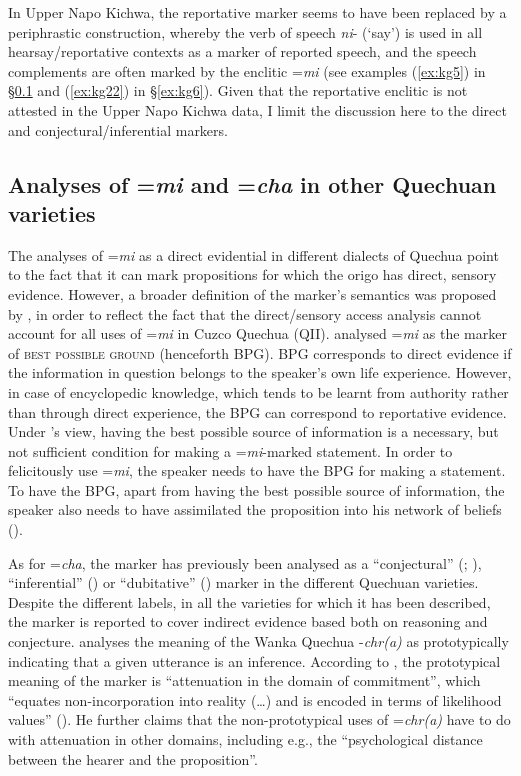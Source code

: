 \documentclass[output=paper]{langscibook}
\begin{document}
In Upper Napo Kichwa, the reportative marker  seems to have been replaced by a periphrastic construction, whereby the verb of speech \textit{ni}- (‘say’) is used in all hearsay/reportative contexts as a marker of reported speech, and the speech complements are often marked by the enclitic =\textit{mi} (see examples (\ref{ex:kg5}) in §‎\ref{s:kg3-2} and (\ref{ex:kg22}) in §‎\ref{ex:kg6}). Given that the reportative enclitic is not attested in the Upper Napo Kichwa data, I limit the discussion here to the direct and conjectural/inferential markers.


\subsection{Analyses of =\textit{mi} and =\textit{cha} in other Quechuan varieties}\label{s:kg3-2}

The analyses of =\textit{mi} as a direct evidential in different dialects of Quechua point to the fact that it can mark propositions for which the origo has direct, sensory evidence. However, a broader definition of the marker’s semantics was proposed by \cite{Faller2002}, in order to reflect the fact that the direct/sensory access analysis cannot account for all uses of =\textit{mi} in Cuzco Quechua (QII). \cite{Faller2002} analysed =\textit{mi} as the marker of \textsc{best possible ground} (henceforth BPG). BPG corresponds to direct evidence if the information in question belongs to the speaker’s own life experience. However, in case of encyclopedic knowledge, which tends to be learnt from authority rather than through direct experience, the BPG can correspond to reportative evidence. Under \citeauthor{Faller2002}’s view, having the best possible source of information is a necessary, but not sufficient condition for making a =\textit{mi}-marked statement. In order to felicitously use =\textit{mi}, the speaker needs to have the BPG for making a statement. To have the BPG, apart from having the best possible source of information, the speaker also needs to have assimilated the proposition into his network of beliefs (\citealt[140--141]{Faller2002}).

As for =\textit{cha}, the marker has previously been analysed as a “conjectural” (\citealt{Weber1986}; \citealt{Faller2002}), “inferential” (\citealt{Floyd1997}) or “dubitative” (\citealt{Muysken1995}) marker in the different Quechuan varieties. Despite the different labels, in all the varieties for which it has been described, the marker is reported to cover indirect evidence based both on reasoning and conjecture. \cite[ch.5]{Floyd1997} analyses the meaning of the Wanka Quechua -\textit{chr(a)} as prototypically indicating that a given utterance is an inference. According to \citeauthor{Floyd1997}, the prototypical meaning of the marker is “attenuation in the domain of commitment”, which “equates non-incorporation into reality (…) and is encoded in terms of likelihood values” (\citealt[106]{Floyd1997}). He further claims that the non-prototypical uses of =\textit{chr(a)} have to do with attenuation in other domains, including e.g., the “psychological distance between the hearer and the proposition”.
\end{document}
